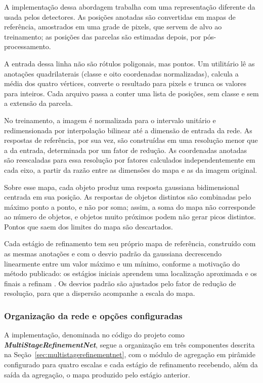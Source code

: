 A implementa\c{c}\~ao dessa abordagem trabalha com uma representa\c{c}\~ao diferente da usada pelos detectores. As posi\c{c}\~oes anotadas s\~ao convertidas em mapas de refer\^encia, amostrados em uma grade de pixels, que servem de alvo ao treinamento; as posi\c{c}\~oes das parcelas s\~ao estimadas depois, por p\'os-processamento.

A entrada dessa linha n\~ao s\~ao r\'otulos poligonais, mas pontos. Um utilit\'ario l\^e as anota\c{c}\~oes quadrilaterais (classe e oito coordenadas normalizadas), calcula a m\'edia dos quatro v\'ertices, converte o resultado para pixels e trunca os valores para inteiros. Cada arquivo passa a conter uma lista de posi\c{c}\~oes, sem classe e sem a extens\~ao da parcela.

No treinamento, a imagem \'e normalizada para o intervalo unit\'ario e redimensionada por interpola\c{c}\~ao bilinear at\'e a dimens\~ao de entrada da rede. As respostas de refer\^encia, por sua vez, s\~ao constru\'idas em uma resolu\c{c}\~ao menor que a da entrada, determinada por um fator de redu\c{c}\~ao. As coordenadas anotadas s\~ao reescaladas para essa resolu\c{c}\~ao por fatores calculados independentemente em cada eixo, a partir da raz\~ao entre as dimens\~oes do mapa e as da imagem original.

Sobre esse mapa, cada objeto produz uma resposta gaussiana bidimensional centrada em sua posi\c{c}\~ao. As respostas de objetos distintos s\~ao combinadas pelo m\'aximo ponto a ponto, e n\~ao por soma; assim, a soma do mapa n\~ao corresponde ao n\'umero de objetos, e objetos muito pr\'oximos podem n\~ao gerar picos distintos. Pontos que saem dos limites do mapa s\~ao descartados.

Cada est\'agio de refinamento tem seu pr\'oprio mapa de refer\^encia, constru\'ido com as mesmas anota\c{c}\~oes e com o desvio padr\~ao da gaussiana decrescendo linearmente entre um valor m\'aximo e um m\'inimo, conforme a motiva\c{c}\~ao do m\'etodo publicado: os est\'agios iniciais aprendem uma localiza\c{c}\~ao aproximada e os finais a refinam \citep{arruda2022}. Os desvios padr\~ao s\~ao ajustados pelo fator de redu\c{c}\~ao de resolu\c{c}\~ao, para que a dispers\~ao acompanhe a escala do mapa.

\subsubsection*{Organiza\c{c}\~ao da rede e op\c{c}\~oes configuradas}

A implementa\c{c}\~ao, denominada no c\'odigo do projeto como \textit{\textbf{MultiStageRefinementNet}}, segue a organiza\c{c}\~ao em tr\^es componentes descrita na Se\c{c}\~ao~\ref{sec:multistagerefinementnet}, com o m\'odulo de agrega\c{c}\~ao em pir\^amide configurado para quatro escalas e cada est\'agio de refinamento recebendo, al\'em da sa\'ida da agrega\c{c}\~ao, o mapa produzido pelo est\'agio anterior.

